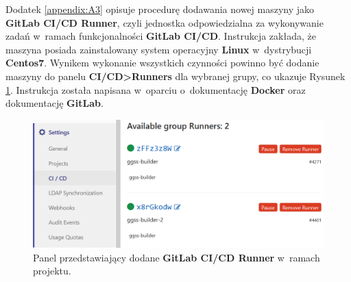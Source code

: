 \onecolumn




\newpage





Dodatek \ref{appendix:A3} opisuje procedurę dodawania nowej maszyny jako \textbf{GitLab CI/CD Runner}, czyli jednostka odpowiedzialna za wykonywanie zadań w~ramach funkcjonalności \textbf{GitLab CI/CD}. Instrukcja zakłada, że maszyna posiada zainstalowany system operacyjny \textbf{Linux} w~dystrybucji \textbf{Centos7}. Wynikem wykonanie wszystkich czynności powinno być dodanie maszyny do panelu \textbf{CI/CD>Runners} dla wybranej grupy, co ukazuje Rysunek \ref{fig:runner}. Instrukcja została napisana w~oparciu o~dokumentację \textbf{Docker}\cite{DockerInstall} oraz dokumentację \textbf{GitLab}\cite{RunnerRegister}.

\begin{figure}
\caption{Panel przedstawiający dodane \textbf{GitLab CI/CD Runner} w~ramach projektu.}
\label{fig:runner}
\includegraphics[width=\textwidth]{res/png/runnerAdded}
\end{figure}
